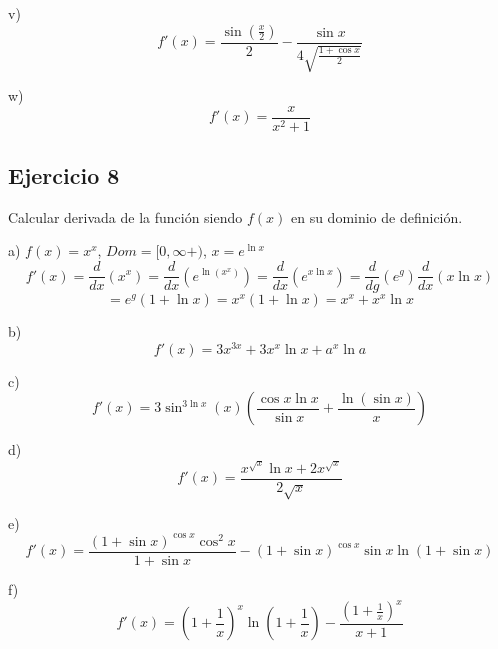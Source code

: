 \documentclass[18pt, a4paper]{article}
\begin{document}
v) $$f'(x)= \frac{\sin \left(\frac{x}{2}\right)}{2} - \frac{\sin x}{4\sqrt{\frac{1+\cos x}{2}}}$$

w) $$f'(x)=\frac{x}{x^2+1}$$


\subsection{Ejercicio 8}
Calcular derivada de la función siendo $f(x)$ en su dominio de definición.

a) $f(x)=x^x$, $Dom=[0, \infty+)$, $x=e^{\ln x}$
$$f'(x)=\frac{d}{dx}\left(x^x\right) = \frac{d}{dx}\left(e^{\ln(x^x)}\right)=\frac{d}{dx}\left(e^{x\ln x}\right)=\frac{d}{dg}\left(e^{g}\right)\frac{d}{dx}\left(x\ln x\right)$$
$$= e^g ( 1 + \ln x) = x^x(1+\ln x) = x^x + x^x\ln x$$ 

b) $$f'(x)= 3x^{3x} + 3x^x\ln x + a^x\ln a$$

c) $$f'(x)=3\sin^{3\ln x}(x)\left(\frac{\cos x \ln x}{\sin x} + \frac{\ln (\sin x)}{x}\right)$$

d) $$f'(x)=\frac{x^{\sqrt{x}}\ln x +  2x^{\sqrt{x}}}{2\sqrt{x}}$$

e) $$f'(x)=\frac{\left(1+\sin x \right)^{\cos x}\cos^2x}{1+\sin x} - \left(1+\sin x \right)^{\cos x}\sin x \ln (1+\sin x)$$

f) $$f'(x)=\left(1+\frac{1}{x}\right)^x \ln \left(1 + \frac{1}{x}\right) - \frac{\left(1+\frac{1}{x}\right)^x}{x+1}$$
\end{document}
